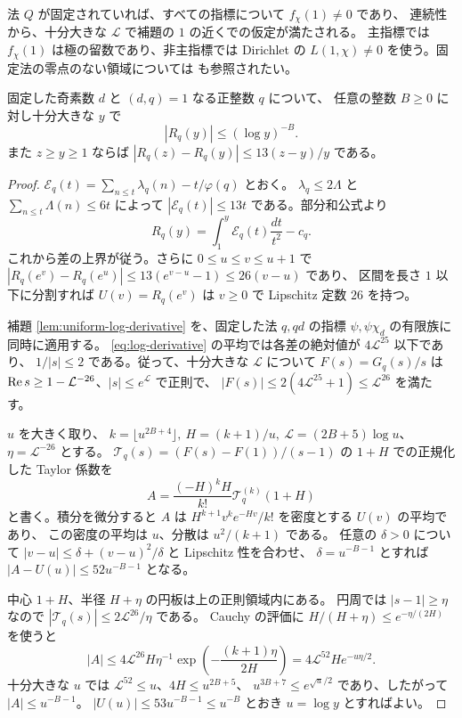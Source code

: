 法 \(Q\) が固定されていれば、すべての指標について \(f_\chi(1)\ne0\) であり、
連続性から、十分大きな \(\mathcal L\) で補題の \(1\) の近くでの仮定が満たされる。
主指標では \(f_\chi(1)\) は極の留数であり、非主指標では
Dirichlet の \(L(1,\chi)\ne0\) を使う。固定法の零点のない領域については
\cite[第11章]{mv} も参照されたい。

\begin{lemma}\label{lem:fixed-modulus-pnt}
固定した奇素数 \(d\) と \((d,q)=1\) なる正整数 \(q\) について、
任意の整数 \(B\ge0\) に対し十分大きな \(y\) で
\[
 |R_q(y)|\le(\log y)^{-B}.
\]
また \(z\ge y\ge1\) ならば \(|R_q(z)-R_q(y)|\le13(z-y)/y\) である。
\end{lemma}

\begin{proof}
\(\mathcal E_q(t)=\sum_{n\le t}\lambda_q(n)-t/\varphi(q)\) とおく。
\(\lambda_q\le2\Lambda\) と \(\sum_{n\le t}\Lambda(n)\le6t\) によって
\(|\mathcal E_q(t)|\le13t\) である。部分和公式より
\[
 R_q(y)=\int_1^y\mathcal E_q(t)\frac{dt}{t^2}-c_q.
\]
これから差の上界が従う。さらに \(0\le u\le v\le u+1\) で
\(|R_q(e^v)-R_q(e^u)|\le13(e^{v-u}-1)\le26(v-u)\) であり、
区間を長さ \(1\) 以下に分割すれば \(U(v)=R_q(e^v)\) は
\(v\ge0\) で Lipschitz 定数 \(26\) を持つ。

補題 \ref{lem:uniform-log-derivative} を、固定した法 \(q,qd\) の指標
\(\psi,\psi\chi_d\) の有限族に同時に適用する。
\eqref{eq:log-derivative} の平均では各差の絶対値が \(4\mathcal L^{25}\) 以下であり、
\(1/|s|\le2\) である。従って、十分大きな \(\mathcal L\) について
\(F(s)=G_q(s)/s\) は
\(\operatorname{Re} s\ge1-\mathcal L^{-26}\)、\(|s|\le e^{\mathcal L}\) で正則で、
\(|F(s)|\le 2(4\mathcal L^{25}+1)\le\mathcal L^{26}\) を満たす。

\(u\) を大きく取り、
\(k=\lfloor u^{2B+4}\rfloor,\ H=(k+1)/u,\ \mathcal L=(2B+5)\log u\)、
\(\eta=\mathcal L^{-26}\) とする。
\(\mathcal T_q(s)=(F(s)-F(1))/(s-1)\) の \(1+H\) での正規化した
Taylor 係数を
\[
 A=\frac{(-H)^k H}{k!}\mathcal T_q^{(k)}(1+H)
\]
と書く。積分を微分すると \(A\) は
\(H^{k+1}v^k e^{-Hv}/k!\) を密度とする \(U(v)\) の平均であり、
この密度の平均は \(u\)、分散は \(u^2/(k+1)\) である。
任意の \(\delta>0\) について
\(|v-u|\le\delta+(v-u)^2/\delta\) と Lipschitz 性を合わせ、
\(\delta=u^{-B-1}\) とすれば \(|A-U(u)|\le52u^{-B-1}\) となる。

中心 \(1+H\)、半径 \(H+\eta\) の円板は上の正則領域内にある。
円周では \(|s-1|\ge\eta\) なので
\(|\mathcal T_q(s)|\le 2\mathcal L^{26}/\eta\) である。
Cauchy の評価に \(H/(H+\eta)\le e^{-\eta/(2H)}\) を使うと
\[
 |A|\le4\mathcal L^{26}H\eta^{-1}
       \exp\!\left(-\frac{(k+1)\eta}{2H}\right)
      =4\mathcal L^{52}H e^{-u\eta/2}.
\]
十分大きな \(u\) では \(\mathcal L^{52}\le u\)、\(4H\le u^{2B+5}\)、
\(u^{3B+7}\le e^{\sqrt{u}/2}\) であり、したがって \(|A|\le u^{-B-1}\)。
\(|U(u)|\le53u^{-B-1}\le u^{-B}\) とおき \(u=\log y\) とすればよい。
\end{proof}

